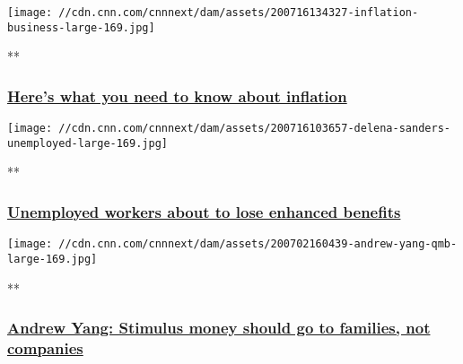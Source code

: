 \href{/videos/business/2020/07/16/what-is-inflation-orig.cnn-business/video/playlists/business-economy/}{}

\texttt{[image: //cdn.cnn.com/cnnnext/dam/assets/200716134327-inflation-business-large-169.jpg]}

**

\hypertarget{heres-what-you-need-to-know-about-inflation}{%
\subsubsection{\texorpdfstring{\href{/videos/business/2020/07/16/what-is-inflation-orig.cnn-business/video/playlists/business-economy/}{Here's
what you need to know about
inflation}}{Here's what you need to know about inflation}}\label{heres-what-you-need-to-know-about-inflation}}

\href{/videos/business/2020/07/16/enhanced-unemployment-benefits-coronavirus.cnnbusiness/video/playlists/business-economy/}{}

\texttt{[image: //cdn.cnn.com/cnnnext/dam/assets/200716103657-delena-sanders-unemployed-large-169.jpg]}

**

\hypertarget{unemployed-workers-about-to-lose-enhanced-benefits}{%
\subsubsection{\texorpdfstring{\href{/videos/business/2020/07/16/enhanced-unemployment-benefits-coronavirus.cnnbusiness/video/playlists/business-economy/}{Unemployed
workers about to lose enhanced
benefits}}{Unemployed workers about to lose enhanced benefits}}\label{unemployed-workers-about-to-lose-enhanced-benefits}}

\href{/videos/business/2020/07/02/andrew-yang-covid-19-stimulus-plan-vpx.cnn/video/playlists/business-economy/}{}

\texttt{[image: //cdn.cnn.com/cnnnext/dam/assets/200702160439-andrew-yang-qmb-large-169.jpg]}

**

\hypertarget{andrew-yang-stimulus-money-should-go-to-families-not-companies}{%
\subsubsection{\texorpdfstring{\href{/videos/business/2020/07/02/andrew-yang-covid-19-stimulus-plan-vpx.cnn/video/playlists/business-economy/}{Andrew
Yang: Stimulus money should go to families, not
companies}}{Andrew Yang: Stimulus money should go to families, not companies}}\label{andrew-yang-stimulus-money-should-go-to-families-not-companies}}

